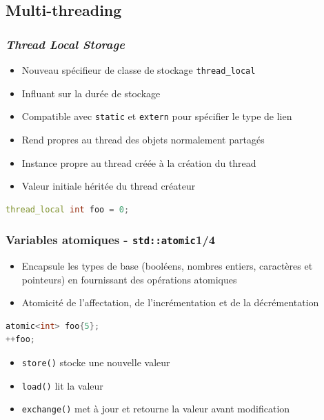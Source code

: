 \documentclass[C++.tex]{subfiles}
\begin{document}
\subsection*{Multi-threading}
\begin{frame}[fragile]
	\frametitle{\textit{Thread Local Storage}}
	\begin{itemize}
		\item Nouveau \og spécifieur de classe de stockage\fg{} \lstinline|thread_local|
		\item Influant sur la durée de stockage
		\item Compatible avec \lstinline|static| et \lstinline|extern| pour spécifier le type de lien
		\item Rend propres au thread des objets normalement partagés


		\item Instance propre au thread créée à la création du thread
		\item Valeur initiale héritée du thread créateur
	\end{itemize}

	\begin{lstlisting}[language=C++]
thread_local int foo = 0;\end{lstlisting}
\end{frame}

\begin{frame}[fragile]
	\frametitle{Variables atomiques - \lstinline|std::atomic|\titlehfill{}1/4}
	\begin{itemize}
		\item Encapsule les types de base (booléens, nombres entiers, caractères et pointeurs) en fournissant des opérations atomiques


		\item Atomicité de l'affectation, de l'incrémentation et de la décrémentation
	\end{itemize}

	\begin{lstlisting}[language=C++]
atomic<int> foo{5};
++foo; \end{lstlisting}

	\begin{itemize}
		\item \lstinline|store()| stocke une nouvelle valeur
		\item \lstinline|load()| lit la valeur
		\item \lstinline|exchange()| met à jour et retourne la valeur avant modification
	\end{itemize}
\end{frame}
\end{document}
